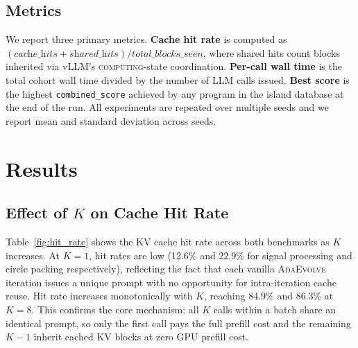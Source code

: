 \documentclass{article}
\newcommand{\adaev}{\textsc{AdaEvolve}}
\begin{document}
\subsection{Metrics}

We report three primary metrics. \textbf{Cache hit rate} is computed as
$(\textit{cache\_hits} + \textit{shared\_hits}) /
\textit{total\_blocks\_seen}$, where shared hits count blocks inherited
via vLLM's \textsc{computing}-state coordination. \textbf{Per-call wall
time} is the total cohort wall time divided by the number of LLM calls
issued. \textbf{Best score} is the highest \texttt{combined\_score}
achieved by any program in the island database at the end of the run.
All experiments are repeated over multiple seeds and we report mean and
standard deviation across seeds.

\section{Results}

\subsection{Effect of $K$ on Cache Hit Rate}

Table~\ref{fig:hit_rate} shows the KV cache hit rate across both
benchmarks as $K$ increases. At $K{=}1$, hit rates are low (12.6\% and
22.9\% for signal processing and circle packing respectively), reflecting
the fact that each vanilla \adaev{} iteration issues a unique prompt with
no opportunity for intra-iteration cache reuse. Hit rate increases
monotonically with $K$, reaching 84.9\% and 86.3\% at $K{=}8$. This
confirms the core mechanism: all $K$ calls within a batch share an
identical prompt, so only the first call pays the full prefill cost and
the remaining $K-1$ inherit cached KV blocks at zero GPU prefill cost.

\end{document}
